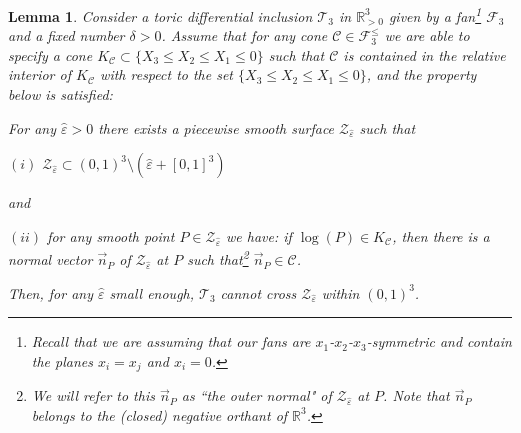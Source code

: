 \documentclass[12pt,letterpaper]{article}
\newtheorem{lem}[thm]{Lemma}
\newcommand{\C}{\mathcal{C}}
\newcommand{\T}{\mathcal{T}}
\newcommand{\F}{\mathcal{F}}
\newcommand{\Z}{\mathcal{Z}}
\newcommand{\RR}{\mathbb{R}}
\newcommand{\eps}{\varepsilon}
\begin{document}
\begin{lem}
\label{lemma_outer_normal_sufficient}
%
Consider a toric differential inclusion $\T_3$ in $\RR^3_{>0}$ given by a  fan\footnote{Recall that we are assuming that our fans are $x_1$-$x_2$-$x_3$-symmetric and contain the planes $x_i=x_j$ and $x_i=0$.}  $\F_3$ and a fixed number $\delta>0$. 
Assume that for any cone $\C \in \F_3^\le$ we are able to specify a cone $K_\C \subset \{ X_3 \le X_2 \le X_1 \le 0 \}$ such that $\C$ is contained in the relative interior of $K_\C$ with respect  to the set $\{ X_3 \le X_2 \le X_1 \le 0 \}$, and the property below is satisfied: 

For any $\hat\eps > 0$ there exists a piecewise smooth surface $\Z_{\hat\eps}$ such that

\smallskip

$(i)$ $\Z_{\hat\eps} \subset (0,1)^3 \setminus (\hat\eps + [0,1]^3)$

\noindent
and  


$(ii)$ for any smooth point $P \in \Z_{\hat\eps}$ we have: if $\log(P) \in K_\C$, then there is a normal vector $\vec{n}_P$ of $\Z_{\hat\eps}$ at $P$ such that\footnote{We will refer to this $\vec{n}_P$ as ``the outer normal" of $\Z_{\hat\eps}$ at $P$. Note that $\vec{n}_P$ belongs to the (closed) negative orthant of $\RR^3$.} $\vec{n}_P \in \C$.

\smallskip

\noindent
Then,  for any $\hat\eps$ small enough, $\T_3$ cannot cross $\Z_{\hat\eps}$ within $(0,1)^3$. 
\end{lem}
\end{document}
